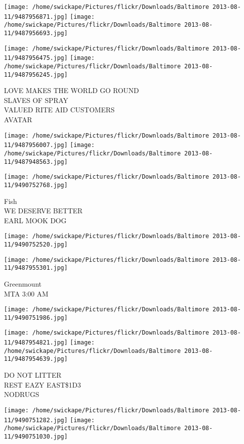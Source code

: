\documentclass[10pt,letterpaper]{article}
\begin{document}
\texttt{[image: /home/swickape/Pictures/flickr/Downloads/Baltimore 2013-08-11/9487956871.jpg]}
\texttt{[image: /home/swickape/Pictures/flickr/Downloads/Baltimore 2013-08-11/9487956693.jpg]}

\texttt{[image: /home/swickape/Pictures/flickr/Downloads/Baltimore 2013-08-11/9487956475.jpg]}
\texttt{[image: /home/swickape/Pictures/flickr/Downloads/Baltimore 2013-08-11/9487956245.jpg]}

LOVE MAKES THE WORLD GO ROUND\\
SLAVES OF SPRAY\\
VALUED RITE AID CUSTOMERS\\
AVATAR
\pagebreak

\texttt{[image: /home/swickape/Pictures/flickr/Downloads/Baltimore 2013-08-11/9487956007.jpg]}
\texttt{[image: /home/swickape/Pictures/flickr/Downloads/Baltimore 2013-08-11/9487948563.jpg]}

\vspace{0.25in}
\texttt{[image: /home/swickape/Pictures/flickr/Downloads/Baltimore 2013-08-11/9490752768.jpg]}

Fish\\
WE DESERVE BETTER\\
EARL MOOK DOG
\pagebreak

\texttt{[image: /home/swickape/Pictures/flickr/Downloads/Baltimore 2013-08-11/9490752520.jpg]}

\vspace{0.25in}
\texttt{[image: /home/swickape/Pictures/flickr/Downloads/Baltimore 2013-08-11/9487955301.jpg]}

Greenmount\\
MTA 3:00 AM
\pagebreak

\texttt{[image: /home/swickape/Pictures/flickr/Downloads/Baltimore 2013-08-11/9490751986.jpg]}

\vspace{0.25in}
\texttt{[image: /home/swickape/Pictures/flickr/Downloads/Baltimore 2013-08-11/9487954821.jpg]}
\texttt{[image: /home/swickape/Pictures/flickr/Downloads/Baltimore 2013-08-11/9487954639.jpg]}

DO NOT LITTER\\
REST EAZY EAST\$1D3\\
NODRUGS
\pagebreak

\texttt{[image: /home/swickape/Pictures/flickr/Downloads/Baltimore 2013-08-11/9490751282.jpg]}
\texttt{[image: /home/swickape/Pictures/flickr/Downloads/Baltimore 2013-08-11/9490751030.jpg]}
\end{document}
